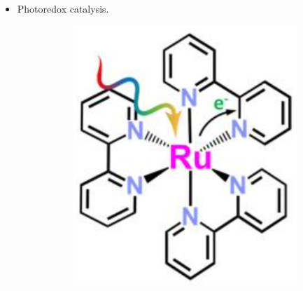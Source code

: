 \documentclass[../notes.tex]{subfiles}
\begin{document}
\begin{itemize}
\begin{itemize}
        \item The compound is anchored onto a  (semiconducting) surface. The band gap is about \SI{3}{\electronvolt}. The \textbf{conduction band} (LUMO for an extended solid) is poised at a level such that when you photoexcite , oxidizing via MLCT  and reducing the  ligand, you get an electron in an orbital (on ) that is higher than the  conduction band.
        \item Thus, you can dump the electron into .
        \item {} is connected to a conducting glass (usually fluorine-doped tin oxide) from which you can harvest the electron and use it for electricity.
        \item An additional redox mediator is used in solution to harvest electrons at a cathode and regenerate ; this is essential in order to be able to do the same thing again (think salt bridge). The mediator goes from
        \begin{equation*}
            \ce{I3- -> 3I-}
        \end{equation*}
        \item The lifetimes aren't that great.
        \item Selling point is that it is made out of very cheap materials, and is efficient because it makes use of very highly allowed MLCTs.
    \end{itemize}
    \item Photoredox catalysis.
    \begin{figure}[h!]
        \centering
        \begin{subfigure}[b]{0.3\linewidth}
            \centering
            \includegraphics[width=0.7\linewidth]{../ExtFiles/photoredoxCatala.png}

\end{subfigure}
\end{figure}
\end{itemize}
\end{document}
